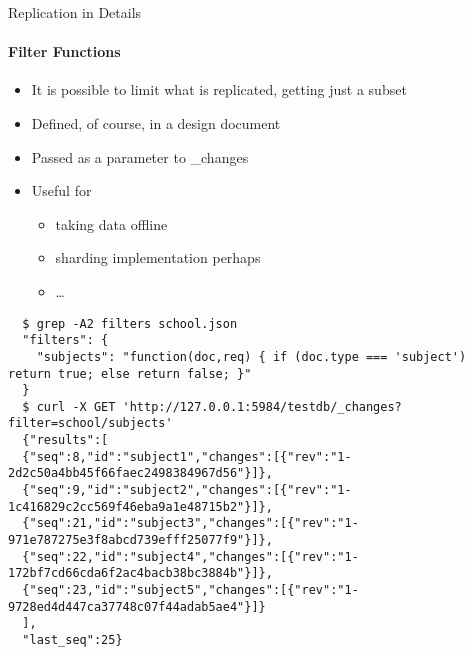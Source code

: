 \documentclass{beamer}
\begin{document}
\begin{frame}[fragile]{Replication in Details}
  \framesubtitle{Filter Functions}
  \begin{itemize}
    \item It is possible to limit what is replicated, getting just a subset
    \item Defined, of course, in a design document
    \item Passed as a parameter to \_changes
    \item Useful for
    \begin{itemize}
      \item taking data offline
      \item sharding implementation perhaps
      \item \ldots
    \end{itemize}
  \end{itemize}
  \fontsize{6}{8}\selectfont
  \begin{verbatim}
  $ grep -A2 filters school.json 
  "filters": {
    "subjects": "function(doc,req) { if (doc.type === 'subject') return true; else return false; }"	
  }
  $ curl -X GET 'http://127.0.0.1:5984/testdb/_changes?filter=school/subjects'
  {"results":[
  {"seq":8,"id":"subject1","changes":[{"rev":"1-2d2c50a4bb45f66faec2498384967d56"}]},
  {"seq":9,"id":"subject2","changes":[{"rev":"1-1c416829c2cc569f46eba9a1e48715b2"}]},
  {"seq":21,"id":"subject3","changes":[{"rev":"1-971e787275e3f8abcd739efff25077f9"}]},
  {"seq":22,"id":"subject4","changes":[{"rev":"1-172bf7cd66cda6f2ac4bacb38bc3884b"}]},
  {"seq":23,"id":"subject5","changes":[{"rev":"1-9728ed4d447ca37748c07f44adab5ae4"}]}
  ],
  "last_seq":25}
  \end{verbatim}
\end{frame}
\end{document}
